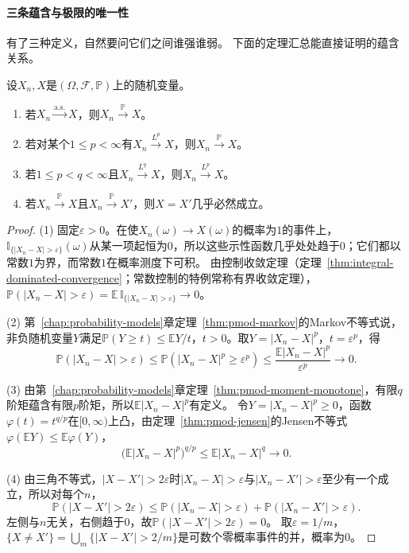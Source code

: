 \paragraph{三条蕴含与极限的唯一性}
有了三种定义，自然要问它们之间谁强谁弱。
下面的定理汇总能直接证明的蕴含关系。

\begin{theorem}[收敛方式之间的蕴含]
\label{thm:conv-implications}
设$X_n,X$是$(\Omega,\mathcal F,\mathbb P)$上的随机变量。
\begin{enumerate}
  \item 若$X_n\xrightarrow{\mathrm{a.s.}}X$，则$X_n\xrightarrow{\mathbb P}X$。
  \item 若对某个$1\leq p<\infty$有$X_n\xrightarrow{L^p}X$，则$X_n\xrightarrow{\mathbb P}X$。
  \item 若$1\leq p<q<\infty$且$X_n\xrightarrow{L^q}X$，则$X_n\xrightarrow{L^p}X$。
  \item 若$X_n\xrightarrow{\mathbb P}X$且$X_n\xrightarrow{\mathbb P}X'$，则$X=X'$几乎必然成立。
\end{enumerate}
\end{theorem}

\begin{proof}
(1) 固定$\varepsilon>0$。在使$X_n(\omega)\to X(\omega)$的概率为$1$的事件上，$\mathbb I_{\{|X_n-X|>\varepsilon\}}(\omega)$从某一项起恒为$0$，所以这些示性函数几乎处处趋于$0$；它们都以常数$1$为界，而常数$1$在概率测度下可积。
由控制收敛定理（定理~\ref{thm:integral-dominated-convergence}；常数控制的特例常称有界收敛定理），$\mathbb P(|X_n-X|>\varepsilon)=\mathbb E\,\mathbb I_{\{|X_n-X|>\varepsilon\}}\to0$。

(2) 第~\ref{chap:probability-models}章定理~\ref{thm:pmod-markov}的Markov不等式说，非负随机变量$Y$满足$\mathbb P(Y\geq t)\leq\mathbb EY/t$，$t>0$。取$Y=|X_n-X|^p$，$t=\varepsilon^p$，得
\[
  \mathbb P(|X_n-X|>\varepsilon)\leq\mathbb P(|X_n-X|^p\geq\varepsilon^p)\leq\frac{\mathbb E|X_n-X|^p}{\varepsilon^p}\to0.
\]

(3) 由第~\ref{chap:probability-models}章定理~\ref{thm:pmod-moment-monotone}，有限$q$阶矩蕴含有限$p$阶矩，所以$\mathbb E|X_n-X|^p$有定义。
令$Y=|X_n-X|^p\geq0$，函数$\varphi(t)=t^{q/p}$在$[0,\infty)$上凸，由定理~\ref{thm:pmod-jensen}的Jensen不等式$\varphi(\mathbb EY)\leq\mathbb E\varphi(Y)$，
\[
  \bigl(\mathbb E|X_n-X|^p\bigr)^{q/p}\leq\mathbb E|X_n-X|^q\to0.
\]

(4) 由三角不等式，$|X-X'|>2\varepsilon$时$|X_n-X|>\varepsilon$与$|X_n-X'|>\varepsilon$至少有一个成立，所以对每个$n$，
\[
  \mathbb P(|X-X'|>2\varepsilon)\leq\mathbb P(|X_n-X|>\varepsilon)+\mathbb P(|X_n-X'|>\varepsilon).
\]
左侧与$n$无关，右侧趋于$0$，故$\mathbb P(|X-X'|>2\varepsilon)=0$。
取$\varepsilon=1/m$，$\{X\neq X'\}=\bigcup_m\{|X-X'|>2/m\}$是可数个零概率事件的并，概率为$0$。
\end{proof}

